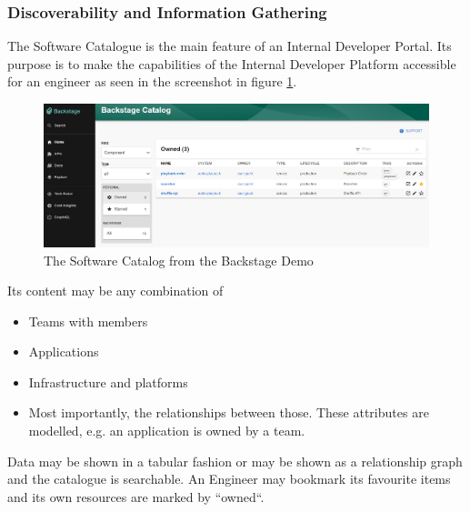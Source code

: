 \documentclass[a4paper,12pt]{article}
\begin{document}
    \subsubsection{Discoverability and Information Gathering}
    \label{sssec:disc}
    The Software Catalogue is the main feature of an Internal Developer Portal.
    Its purpose is to make the capabilities of the Internal Developer Platform accessible for an engineer as seen in the
    screenshot in figure \ref{fig:catalog}.

    \begin{figure}
        \includegraphics[width=\linewidth]{backstage_catalog}
        \caption{The Software Catalog from the Backstage Demo\parencite{backstagedemo}}
        \label{fig:catalog}
    \end{figure}
    Its content may be any combination of
    \begin{itemize}
        \item Teams with members
        \item Applications
        \item Infrastructure and platforms
        \item Most importantly, the relationships between those. These attributes are modelled, e.g. an application is owned by a team.
    \end{itemize}
    Data may be shown in a tabular fashion or may be shown as a relationship graph and the catalogue is searchable.
    An Engineer may bookmark its favourite items and its own resources are marked by ``owned``.
\end{document}
